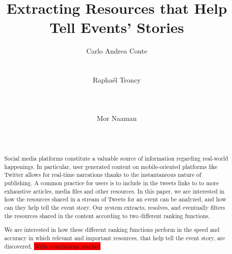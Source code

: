 \documentclass{sig-alternate}
\newcommand{\todo}[1]{\colorbox{red}{#1}}
\begin{document}
\title{Extracting Resources that Help Tell Events' Stories}

\author{
\alignauthor Carlo Andrea Conte\\
	\\
    \\
\alignauthor Rapha\"el Troncy\\
	\\
	\\
		\\
\alignauthor Mor Naaman\\
    \\
    \\
}

\maketitle


\begin{abstract}

Social media platforms constitute a valuable source of information regarding real-world happenings. In particular, user generated content on mobile-oriented platforms like Twitter allows for real-time narrations thanks to the instantaneous nature of publishing. A common practice for users is to include in the tweets links to to more exhaustive articles, media files and other resources. In this paper, we are interested in how the resources shared in a stream of Tweets for an event can be analyzed, and how can they help tell the event story. Our system extracts, resolves, and eventually filters the resources shared in the content according to two different ranking functions. 

We are interested in how these different ranking functions perform in the speed and accuracy in which relevant and important resources, that help tell the event story, are discovered. 
\todo{Write conclusions reached}


\end{abstract}
\end{document}
